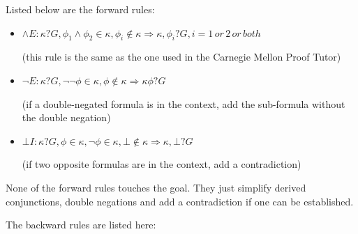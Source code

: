 \documentclass[11pt,twoside,a4paper]{report}
\begin{document}
Listed below are the forward rules:

\begin{itemize}
\item
$\wedge E: \kappa?G, \phi_1\wedge\phi_2\in\kappa, \phi_i\notin\kappa \Rightarrow \kappa,\phi_i?G, i = 1\, or\, 2\, or\, both$

(this rule is the same as the one used in the Carnegie Mellon Proof Tutor)
\item
$\neg E: \kappa?G, \neg\neg\phi\in\kappa, \phi\notin\kappa \Rightarrow \kappa\phi?G$

(if a double-negated formula is in the context, add the sub-formula without the double negation)
\item
$\bot I: \kappa?G, \phi\in\kappa, \neg\phi\in\kappa, \bot\notin\kappa \Rightarrow \kappa,\bot?G$

(if two opposite formulas are in the context, add a contradiction)
\end{itemize}

None of the forward rules touches the goal. They just simplify derived conjunctions, double negations and add a contradiction if one can be established.

The backward rules are listed here:
\end{document}
